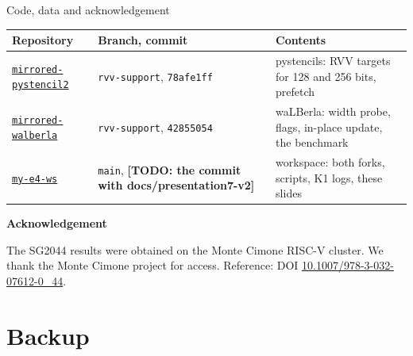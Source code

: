 \documentclass[aspectratio=169,10pt,t]{beamer}
\newcommand{\code}[1]{\texttt{#1}}
\newif\ifshowtodos \showtodostrue
\newcommand{\todo}[1]{\ifshowtodos{\scriptsize\textcolor{psred}{\textbf{[TODO: #1]}}}\fi}
\begin{document}
\begin{frame}{Code, data and acknowledgement}
  \vspace{1mm}
  \small
  \begin{tabularx}{\textwidth}{@{}l l X@{}}
    \toprule
    Repository & Branch, commit & Contents\\
    \midrule
    \href{https://github.com/salehjg/mirrored-pystencil2/tree/rvv-support}{\code{mirrored-pystencil2}}
      & \code{rvv-support}, \code{78afe1ff} & pystencils: RVV targets for 128 and 256 bits, prefetch\\
    \href{https://github.com/salehjg/mirrored-walberla/tree/rvv-support}{\code{mirrored-walberla}}
      & \code{rvv-support}, \code{42855054} & waLBerla: width probe, flags, in-place update, the benchmark\\
    \href{https://github.com/salehjg/my-e4-ws}{\code{my-e4-ws}} & \code{main}, \todo{the commit with docs/presentation7-v2}
      & workspace: both forks, scripts, K1 logs, these slides\\
    \bottomrule
  \end{tabularx}

  \vspace{4mm}
  {\small\bfseries Acknowledgement\par}
  {\footnotesize The SG2044 results were obtained on the Monte Cimone RISC-V cluster. We thank the Monte Cimone
  project for access. Reference: DOI \href{https://doi.org/10.1007/978-3-032-07612-0_44}{10.1007/978-3-032-07612-0\_44}.\par}
  \vfill
  \vspace{2mm}
\end{frame}

\appendix
\section{Backup}
\end{document}
